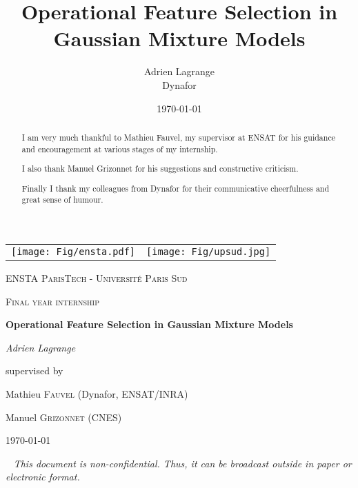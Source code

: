 \documentclass[a4paper,11pt,DIV=16,abstracton]{scrartcl}
\title{Operational Feature Selection in Gaussian Mixture Models}
\author{Adrien Lagrange
\\
\small{Dynafor}}
\date{\today}
\newcommand\blankpage{%
    \null
    \thispagestyle{empty}%
    \newpage}
\begin{document}

\begin{titlepage}
    \centering
    \begin{tabular}{cc}
        \texttt{[image: Fig/ensta.pdf]}\par\vspace{1cm} &
        \texttt{[image: Fig/upsud.jpg]}\par\vspace{1cm} \\
    \end{tabular}

    {\scshape\LARGE ENSTA ParisTech - Université Paris Sud \par}
    \vspace{1cm}
    {\scshape\Large Final year internship\par}
    \vspace{1.5cm}
    {\huge\bfseries Operational Feature Selection in Gaussian Mixture Models\par}
    \vspace{2cm}
    {\Large\itshape Adrien Lagrange\par}
    \vfill
    supervised by\par
    Mathieu \textsc{Fauvel} (Dynafor, ENSAT/INRA)\par
    Manuel \textsc{Grizonnet} (CNES)

    \vfill

    {\large \today\par}

\end{titlepage}

\thispagestyle{empty}
\mbox{~}
\vfill
{\color{red}\Large\itshape This document is non-confidential. Thus, it can be broadcast outside in paper or electronic format.}
\newpage

\renewcommand{\abstractname}{Acknowledgements}
\begin{abstract}
I am very much thankful to Mathieu Fauvel, my supervisor at ENSAT for his guidance and encouragement at various stages of my internship.

I also thank Manuel Grizonnet for his suggestions and constructive criticism.

Finally I thank my colleagues from Dynafor for their communicative cheerfulness and great sense of humour.
\end{abstract}
\end{document}
